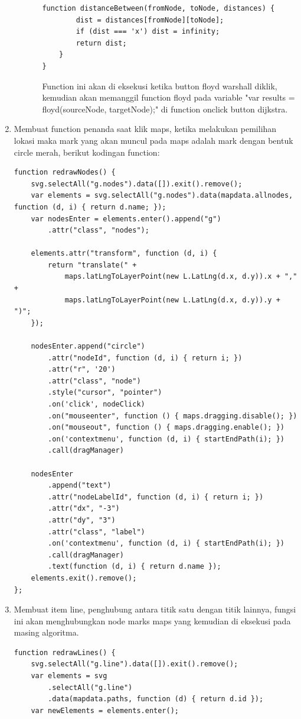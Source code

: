 \begin{enumerate}
\begin{enumerate}
\begin{enumerate}
\begin{lstlisting}[caption=Function Algoritma Dijsktra]
    function distanceBetween(fromNode, toNode, distances) {
        dist = distances[fromNode][toNode];
        if (dist === 'x') dist = infinity;
        return dist;
    }
}
\end{lstlisting}
\par Function ini akan di eksekusi ketika button floyd warshall diklik, kemudian akan memanggil function floyd pada variable "var results = floyd(sourceNode, targetNode);" di function onclick button dijkstra.
    \end{enumerate}
    \end{enumerate}
    
    \item Membuat function penanda saat klik maps, ketika melakukan pemilihan lokasi maka mark yang akan muncul pada maps adalah mark dengan bentuk circle merah, berikut kodingan function:
\begin{lstlisting}[caption=Function Mark Maps]
function redrawNodes() {
    svg.selectAll("g.nodes").data([]).exit().remove();
    var elements = svg.selectAll("g.nodes").data(mapdata.allnodes, function (d, i) { return d.name; });
    var nodesEnter = elements.enter().append("g")
        .attr("class", "nodes");

    elements.attr("transform", function (d, i) {
        return "translate(" +
            maps.latLngToLayerPoint(new L.LatLng(d.x, d.y)).x + "," +
            maps.latLngToLayerPoint(new L.LatLng(d.x, d.y)).y + ")";
    });

    nodesEnter.append("circle")
        .attr("nodeId", function (d, i) { return i; })
        .attr("r", '20')
        .attr("class", "node")
        .style("cursor", "pointer")
        .on('click', nodeClick)
        .on("mouseenter", function () { maps.dragging.disable(); })
        .on("mouseout", function () { maps.dragging.enable(); })
        .on('contextmenu', function (d, i) { startEndPath(i); })
        .call(dragManager)

    nodesEnter
        .append("text")
        .attr("nodeLabelId", function (d, i) { return i; })
        .attr("dx", "-3")
        .attr("dy", "3")
        .attr("class", "label")
        .on('contextmenu', function (d, i) { startEndPath(i); })
        .call(dragManager)
        .text(function (d, i) { return d.name });
    elements.exit().remove();
};
\end{lstlisting}

    \item Membuat item line, penghubung antara titik satu dengan titik lainnya, fungsi ini akan menghubungkan node marks maps yang kemudian di eksekusi pada masing algoritma.
\begin{lstlisting}[caption=Function Lines Maps]
function redrawLines() {
    svg.selectAll("g.line").data([]).exit().remove();
    var elements = svg
        .selectAll("g.line")
        .data(mapdata.paths, function (d) { return d.id });
    var newElements = elements.enter();


\end{lstlisting}
\end{enumerate}
